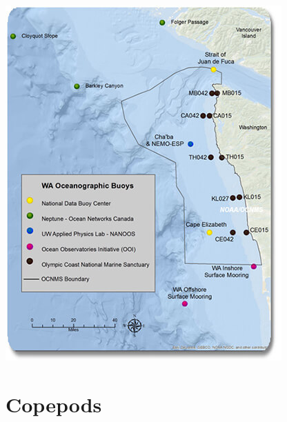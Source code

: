 \documentclass[12pt,twoside]{reedthesis}
\begin{document}
\includegraphics[scale = 0.5]{Fig_OCNMS_buoy_map}


\section{Copepods}
\end{document}
